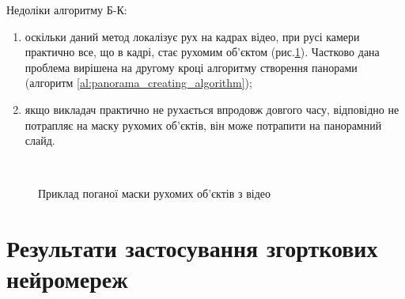 Недоліки алгоритму Б-К:
\begin{enumerate}
    \item оскільки даний метод локалізує рух на кадрах відео,
          при русі камери практично все, що в кадрі, стає рухомим об'єктом
          (рис.\ref{fig:bk_bad_mask}).
          Частково дана проблема вирішена на другому кроці алгоритму створення панорами
          (алгоритм \ref{al:panorama_creating_algorithm});
    \item якщо викладач практично не рухається впродовж довгого часу, відповідно не потрапляє
          на маску рухомих об'єктів, він може потрапити на панорамний слайд.
\end{enumerate}

\begin{figure}[H]
    \centering

     \\
    \caption{Приклад поганої маски рухомих об'єктів з відео \cite{dorohovtsev_video}
        \label{fig:bk_bad_mask}
    }
\end{figure}

\section{Результати застосування згорткових нейромереж}

